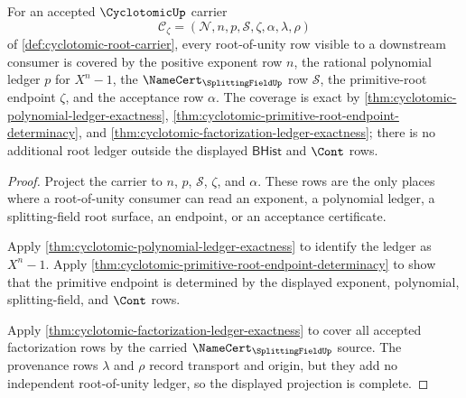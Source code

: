 \begin{theorem}
\label{thm:cyclotomic-root-of-unity-ledger-coverage}
For an accepted $\CyclotomicUp$ carrier
$$
\mathcal{C}_{\zeta}=(\mathcal{N},n,p,\mathcal{S},\zeta,\alpha,\lambda,\rho)
$$
of \autoref{def:cyclotomic-root-carrier}, every root-of-unity row visible to a downstream consumer is covered by the positive exponent row $n$, the rational polynomial ledger $p$ for $X^n-1$, the $\NameCert_{\SplittingFieldUp}$ row $\mathcal{S}$, the primitive-root endpoint $\zeta$, and the acceptance row $\alpha$. The coverage is exact by \autoref{thm:cyclotomic-polynomial-ledger-exactness}, \autoref{thm:cyclotomic-primitive-root-endpoint-determinacy}, and \autoref{thm:cyclotomic-factorization-ledger-exactness}; there is no additional root ledger outside the displayed $\mathsf{BHist}$ and $\Cont$ rows.
\end{theorem}
\begin{proof}
Project the carrier to $n$, $p$, $\mathcal{S}$, $\zeta$, and $\alpha$. These rows are the only places where a root-of-unity consumer can read an exponent, a polynomial ledger, a splitting-field root surface, an endpoint, or an acceptance certificate.

Apply \autoref{thm:cyclotomic-polynomial-ledger-exactness} to identify the ledger as $X^n-1$. Apply \autoref{thm:cyclotomic-primitive-root-endpoint-determinacy} to show that the primitive endpoint is determined by the displayed exponent, polynomial, splitting-field, and $\Cont$ rows.

Apply \autoref{thm:cyclotomic-factorization-ledger-exactness} to cover all accepted factorization rows by the carried $\NameCert_{\SplittingFieldUp}$ source. The provenance rows $\lambda$ and $\rho$ record transport and origin, but they add no independent root-of-unity ledger, so the displayed projection is complete.
\end{proof}

